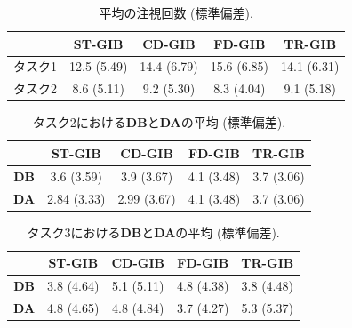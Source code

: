 \documentclass{kuee}
\begin{document}
\begin{table}[b]
  \begin{center}
  \caption{平均の注視回数 (標準偏差). \label{table:gazecount-task12}}
  \begin{tabular}{|c|c|c|c|c|} \hline
  & ST-GIB & CD-GIB & FD-GIB & TR-GIB \\ \hline
  タスク1 & 12.5 (5.49) & 14.4 (6.79) & 15.6 (6.85) & 14.1 (6.31) \\ \hline
  タスク2 & 8.6 (5.11) & 9.2 (5.30) & 8.3 (4.04) & 9.1 (5.18) \\ \hline
  \end{tabular}
  \end{center}
\end{table}

\begin{table}[b]
  \begin{center}
  \caption{タスク2における{\bf DB}と{\bf DA}の平均 (標準偏差). \label{table:db_and_da_task12}}
  \begin{tabular}{|c|c|c|c|c|} \hline
  & ST-GIB & CD-GIB & FD-GIB & TR-GIB \\ \hline
  {\bf DB} & 3.6 (3.59) & 3.9 (3.67) & 4.1 (3.48) & 3.7 (3.06) \\ \hline
  {\bf DA} & 2.84 (3.33) & 2.99 (3.67) & 4.1 (3.48) & 3.7 (3.06) \\ \hline
  \end{tabular}
  \end{center}
\end{table}

\begin{table}[b]
  \begin{center}
  \caption{タスク3における{\bf DB}と{\bf DA}の平均 (標準偏差). \label{table:db_and_da_task3}}
  \begin{tabular}{|c|c|c|c|c|} \hline
  & ST-GIB & CD-GIB & FD-GIB & TR-GIB \\ \hline
  {\bf DB} & 3.8 (4.64) & 5.1 (5.11) & 4.8 (4.38) & 3.8 (4.48) \\ \hline
  {\bf DA} & 4.8 (4.65) & 4.8 (4.84) & 3.7 (4.27) & 5.3 (5.37) \\ \hline
  \end{tabular}
  \end{center}
\end{table}
\end{document}
